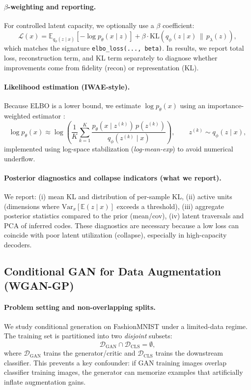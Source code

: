 \paragraph{$\beta$-weighting and reporting.}
For controlled latent capacity, we optionally use a $\beta$ coefficient:
\[
\mathcal{L}(x)=\mathbb{E}_{q_\phi(z\mid x)}[-\log p_\theta(x\mid z)] + \beta\cdot \mathrm{KL}\!\left(q_\phi(z\mid x)\,\|\,p_\lambda(z)\right),
\]
which matches the signature \texttt{elbo\_loss(..., beta)}. In results, we report total loss, reconstruction term, and KL term separately to diagnose whether improvements come from fidelity (recon) or representation (KL).

\paragraph{Likelihood estimation (IWAE-style).}
Because ELBO is a lower bound, we estimate $\log p_\theta(x)$ using an importance-weighted estimator \citep{burda2016iwae}:
\[
\log p_\theta(x)\approx
\log\left(\frac{1}{K}\sum_{k=1}^{K}
\frac{p_\theta(x\mid z^{(k)})\,p(z^{(k)})}{q_\phi(z^{(k)}\mid x)}\right),
\qquad z^{(k)}\sim q_\phi(z\mid x),
\]
implemented using log-space stabilization (\emph{log-mean-exp}) to avoid numerical underflow.

\paragraph{Posterior diagnostics and collapse indicators (what we report).}
We report:
(i) mean KL and distribution of per-sample KL,
(ii) active units (dimensions where $\mathrm{Var}_x[\mathbb{E}(z\mid x)]$ exceeds a threshold),
(iii) aggregate posterior statistics compared to the prior (mean/cov),
(iv) latent traversals and PCA of inferred codes.
These diagnostics are necessary because a low loss can coincide with poor latent utilization (collapse), especially in high-capacity decoders.

\vspace{0.5em}
\subsection{Conditional GAN for Data Augmentation (WGAN-GP)}
\paragraph{Problem setting and non-overlapping splits.}
We study conditional generation on FashionMNIST under a limited-data regime. The training set is partitioned into two \emph{disjoint} subsets:
\[
\mathcal{D}_{\mathrm{GAN}} \cap \mathcal{D}_{\mathrm{CLS}}=\emptyset,
\]
where $\mathcal{D}_{\mathrm{GAN}}$ trains the generator/critic and $\mathcal{D}_{\mathrm{CLS}}$ trains the downstream classifier. This prevents a key confounder: if GAN training images overlap classifier training images, the generator can memorize examples that artificially inflate augmentation gains.

